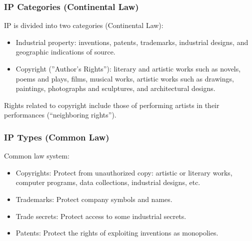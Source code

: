 \documentclass{beamer}
\begin{document}
\begin{frame}
\frametitle{IP Categories (Continental Law)}

IP is divided into two categories (Continental Law):  

\begin{itemize}
\item \alert{Industrial property}: inventions, patents, trademarks, industrial designs, and geographic indications of source. 
\item \alert{Copyright} (''Author's Rights''): literary and artistic works such as novels, poems and plays, films, musical works, artistic works such as drawings, paintings, photographs and sculptures, and architectural designs.  
\end{itemize}

Rights related to copyright include those of performing artists in their performances (``neighboring rights'').  

\end{frame}



\begin{frame}
\frametitle{IP Types (Common Law)}

\alert{Common law} system:
\begin{itemize}
\item \alert{Copyrights}: Protect from unauthorized copy: artistic or literary
  works, computer programs, data collections, industrial designs, etc.
\item \alert{Trademarks}: Protect company symbols and names.
\item \alert{Trade secrets}: Protect access to some industrial secrets.
\item \alert{Patents}: Protect the rights of exploiting inventions as monopolies.
\end{itemize}

\end{frame}



\end{document}
